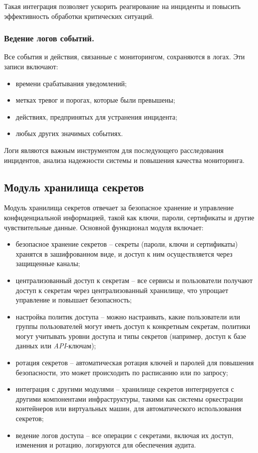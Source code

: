 Такая интеграция позволяет ускорить реагирование на инциденты и повысить эффективность обработки критических ситуаций.

\subsubsection{Ведение логов событий.}  
Все события и действия, связанные с мониторингом, сохраняются в логах. Эти записи включают:

\begin{itemize}
    \item времени срабатывания уведомлений;
    \item метках тревог и порогах, которые были превышены;
    \item действиях, предпринятых для устранения инцидента;
    \item любых других значимых событиях.
\end{itemize}

Логи являются важным инструментом для последующего расследования инцидентов, анализа надежности системы и повышения качества мониторинга.

\subsection{Модуль хранилища секретов}
\label{sec:secrets_storage_functionality}

Модуль хранилища секретов отвечает за безопасное хранение и управление конфиденциальной информацией, такой как ключи, пароли, сертификаты и другие чувствительные данные. Основной функционал модуля включает:

\begin{itemize}
    \item безопасное хранение секретов -- секреты (пароли, ключи и сертификаты) хранятся в зашифрованном виде, и доступ к ним осуществляется через защищенные каналы; 
    \item централизованный доступ к секретам -- все сервисы и пользователи получают доступ к секретам через централизованный хранилище, что упрощает управление и повышает безопасность; 
    \item настройка политик доступа -- можно настраивать, какие пользователи или группы пользователей могут иметь доступ к конкретным секретам, политики могут учитывать уровни доступа и типы секретов (например, доступ к базе данных или \textit{API}-ключам); 
    \item ротация секретов -- автоматическая ротация ключей и паролей для повышения безопасности, это может происходить по расписанию или по запросу; 
    \item интеграция с другими модулями -- хранилище секретов интегрируется с другими компонентами инфраструктуры, такими как системы оркестрации контейнеров или виртуальных машин, для автоматического использования секретов; 
    \item ведение логов доступа -- все операции с секретами, включая их доступ, изменения и ротацию, логируются для обеспечения аудита. 
\end{itemize}

